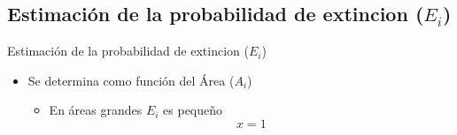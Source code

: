 \documentclass[
  11pt,
  ignorenonframetext,
]{beamer}
\providecommand{\tightlist}{%
  \setlength{\itemsep}{0pt}\setlength{\parskip}{0pt}}
\begin{document}
\hypertarget{estimaciuxf3n-de-la-probabilidad-de-extincion-e_i}{%
\subsection{\texorpdfstring{Estimación de la probabilidad de extincion
(\(E_i\))}{Estimación de la probabilidad de extincion (E\_i)}}\label{estimaciuxf3n-de-la-probabilidad-de-extincion-e_i}}

\begin{frame}{Estimación de la probabilidad de extincion (\(E_i\))}
\begin{itemize}
\item
  Se determina como función del Área (\(A_i\))

  \begin{itemize}
  \tightlist
  \item
    En áreas grandes \(E_i\) es pequeño \begin{equation}
    x = 1
    \end{equation}
  \end{itemize}
\end{itemize}
\end{frame}
\end{document}
